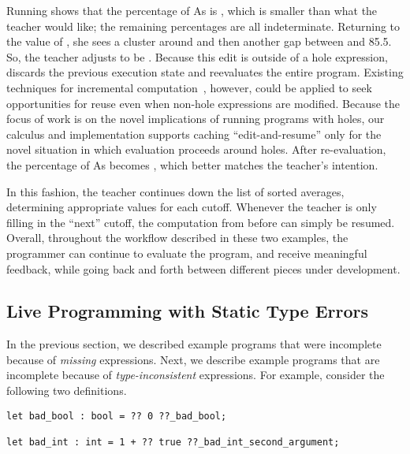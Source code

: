 \noindent
%
Running  shows that the percentage of As is
, which is smaller than what the teacher would like;
the remaining percentages are all indeterminate.
%
Returning to the value of , she sees a cluster around 
and then another gap between  and {85.5}.
%
So, the teacher adjusts  to be .
%
Because this edit is outside of a hole expression, \HazelnutLive{} discards the
previous execution state and reevaluates the entire program.
%
Existing techniques for incremental computation~\cite{XXX,XXX}, however, could
be applied to seek opportunities for reuse even when non-hole expressions are
modified.
%
Because the focus of work is on the novel implications of running programs with
holes, our calculus and implementation supports caching ``edit-and-resume'' only
for the novel situation in which evaluation proceeds around holes.
%
After re-evaluation, the percentage of As becomes , which better
matches the teacher's intention.

In this fashion, the teacher continues down the list of sorted averages,
determining appropriate values for each cutoff.
%
Whenever the teacher is only filling in the ``next'' cutoff, the computation
from before can simply be resumed.
%
Overall, throughout the workflow described in these two examples, the programmer
can continue to evaluate the program, and receive meaningful feedback, while
going back and forth between different pieces under development.


\subsection{Live Programming with Static Type Errors}

In the previous section, we described example programs that were incomplete
because of \emph{missing} expressions.
%
Next, we describe example programs that are incomplete because of
\emph{type-inconsistent} expressions.
%
For example, consider the following two definitions.

\begin{lstlisting}
let bad_bool : bool = ?? 0 ??_bad_bool;

let bad_int : int = 1 + ?? true ??_bad_int_second_argument;
\end{lstlisting}


